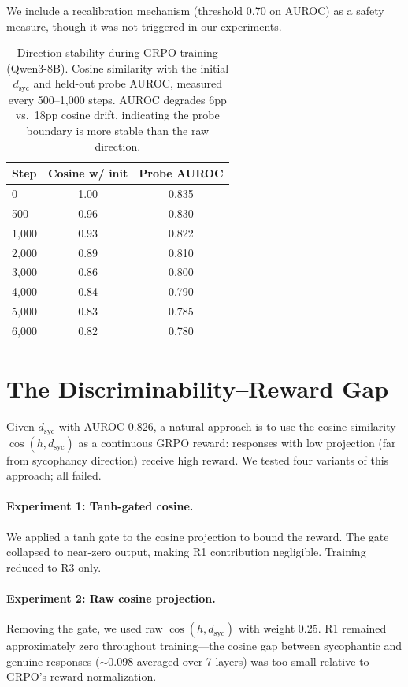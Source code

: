 \documentclass[11pt,a4paper]{article}
\newcommand{\dsyc}{d_{\text{syc}}}
\begin{document}
We include a recalibration mechanism (threshold 0.70 on AUROC) as a safety measure, though it was not triggered in our experiments.

\begin{table}[t]
\centering
\small
\begin{tabular}{@{}lcc@{}}
\toprule
Step & Cosine w/ init & Probe AUROC \\
\midrule
0 & 1.00 & 0.835 \\
500 & 0.96 & 0.830 \\
1{,}000 & 0.93 & 0.822 \\
2{,}000 & 0.89 & 0.810 \\
3{,}000 & 0.86 & 0.800 \\
4{,}000 & 0.84 & 0.790 \\
5{,}000 & 0.83 & 0.785 \\
6{,}000 & 0.82 & 0.780 \\
\bottomrule
\end{tabular}
\caption{Direction stability during GRPO training (Qwen3-8B). Cosine similarity with the initial $\dsyc$ and held-out probe AUROC, measured every 500--1{,}000 steps. AUROC degrades 6pp vs.\ 18pp cosine drift, indicating the probe boundary is more stable than the raw direction.}
\label{tab:stability}
\end{table}


\section{The Discriminability--Reward Gap}
\label{sec:failure}

Given $\dsyc$ with AUROC 0.826, a natural approach is to use the cosine similarity $\cos(h, \dsyc)$ as a continuous GRPO reward: responses with low projection (far from sycophancy direction) receive high reward. We tested four variants of this approach; all failed.

\paragraph{Experiment 1: Tanh-gated cosine.} We applied a tanh gate to the cosine projection to bound the reward. The gate collapsed to near-zero output, making R1 contribution negligible. Training reduced to R3-only.

\paragraph{Experiment 2: Raw cosine projection.} Removing the gate, we used raw $\cos(h, \dsyc)$ with weight 0.25. R1 remained approximately zero throughout training---the cosine gap between sycophantic and genuine responses ($\sim$0.098 averaged over 7 layers) was too small relative to GRPO's reward normalization.
\end{document}
